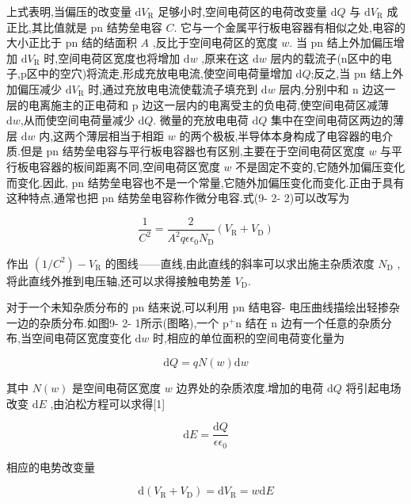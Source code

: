 \documentclass[12pt,a4paper]{article}
\begin{document}
上式表明,当偏压的改变量 \(\mathrm{d}V_{\mathrm{R}}\) 足够小时,空间电荷区的电荷改变量 \(\mathrm{d}Q\) 与 \(\mathrm{d}V_{\mathrm{R}}\) 成正比,其比值就是 \(\mathrm{pn}\) 结势垒电容 \(C\). 它与一个金属平行板电容器有相似之处,电容的大小正比于 \(\mathrm{pn}\) 结的结面积 \(A\) ,反比于空间电荷区的宽度 \(w\). 当 \(\mathrm{pn}\) 结上外加偏压增加 \(\mathrm{d}V_{\mathrm{R}}\) 时,空间电荷区宽度也将增加 \(\mathrm{d}w\) ,原来在这 \(\mathrm{d}w\) 层内的载流子(n区中的电子,p区中的空穴)将流走,形成充放电电流,使空间电荷量增加 \(\mathrm{d}Q\);反之,当 \(\mathrm{pn}\) 结上外加偏压减少 \(\mathrm{d}V_{\mathrm{R}}\) 时,通过充放电电流使载流子填充到 \(\mathrm{d}w\) 层内,分别中和 \(\mathrm{n}\) 边这一层的电离施主的正电荷和 \(\mathrm{p}\) 边这一层内的电离受主的负电荷,使空间电荷区减薄 \(\mathrm{d}w\),从而使空间电荷量减少 \(\mathrm{d}Q\). 微量的充放电电荷 \(\mathrm{d}Q\) 集中在空间电荷区两边的薄层 \(\mathrm{d}w\) 内,这两个薄层相当于相距 \(w\) 的两个极板,半导体本身构成了电容器的电介质.但是 \(\mathrm{pn}\) 结势垒电容与平行板电容器也有区别,主要在于空间电荷区宽度 \(w\) 与平行板电容器的板间距离不同,空间电荷区宽度 \(w\) 不是固定不变的,它随外加偏压变化而变化.因此, \(\mathrm{pn}\) 结势垒电容也不是一个常量,它随外加偏压变化而变化.正由于具有这种特点,通常也把 \(\mathrm{pn}\) 结势垒电容称作微分电容.式(9- 2- 2)可以改写为

\[
\frac{1}{C^{2}} = \frac{2}{A^{2}q\epsilon \epsilon_{0}N_{\mathrm{D}}}\left(V_{\mathrm{R}} + V_{\mathrm{D}}\right) \tag{9-2-3}
\]

作出 \((1 / C^{2}) - V_{\mathrm{R}}\) 的图线——直线,由此直线的斜率可以求出施主杂质浓度 \(N_{\mathrm{D}}\) ,将此直线外推到电压轴,还可以求得接触电势差 \(V_{\mathrm{D}}\).

对于一个未知杂质分布的 \(\mathrm{pn}\) 结来说,可以利用 \(\mathrm{pn}\) 结电容- 电压曲线描绘出轻掺杂一边的杂质分布.如图9- 2- 1所示(图略),一个 \(\mathrm{p}^{+}\mathrm{n}\) 结在 \(\mathrm{n}\) 边有一个任意的杂质分布,当空间电荷区宽度变化 \(\mathrm{d}w\) 时,相应的单位面积的空间电荷变化量为

\[
\mathrm{d}Q = qN(w)\mathrm{d}w \tag{9-2-4}
\]

其中 \(N(w)\) 是空间电荷区宽度 \(w\) 边界处的杂质浓度.增加的电荷 \(\mathrm{d}Q\) 将引起电场改变 \(\mathrm{d}E\) ,由泊松方程可以求得[1]

\[
\mathrm{d}E = \frac{\mathrm{d}Q}{\epsilon \epsilon_{0}}
\]

相应的电势改变量

\[
\mathrm{d}\left(V_{\mathrm{R}} + V_{\mathrm{D}}\right) = \mathrm{d}V_{\mathrm{R}} = w\mathrm{d}E
\]
\end{document}
